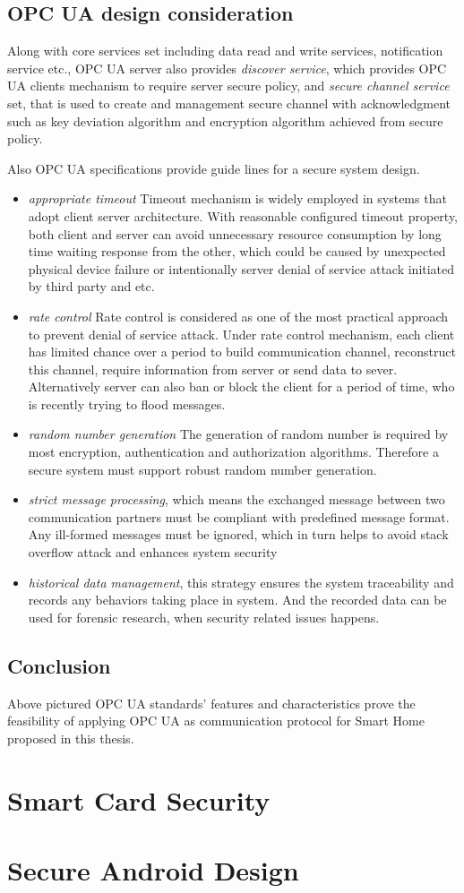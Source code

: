 \subsection{OPC UA design consideration}
Along with core services set including data read and write services, notification service etc., OPC UA server also provides \emph{discover service}\cite{O4}, which provides OPC UA clients mechanism to require server secure policy, and \emph{secure channel service} set\cite{O4}, that is used to create and management secure channel with acknowledgment such as key deviation algorithm and encryption algorithm achieved from secure policy. 

Also OPC UA specifications provide guide lines for a secure system design\cite{O4}.
\begin{itemize}
\item \emph{appropriate timeout} Timeout mechanism is widely employed in systems that adopt client server architecture. With reasonable configured timeout property, both client and server can avoid unnecessary resource consumption by long time waiting response from the other, which could be caused by unexpected physical device failure or intentionally server denial of service attack initiated by third party and etc. 
\item \emph{rate control} Rate control is considered as one of the most practical approach to prevent denial of service attack. Under rate control mechanism, each client has limited chance over a period to build communication channel, reconstruct this channel, require information from server or send data to sever. Alternatively server can also ban or block the client for a period of time, who is recently trying to flood messages. 
\item \emph{random number generation} The generation of random number is required by most encryption, authentication and authorization algorithms. Therefore a secure system must support robust random number generation.
\item \emph{strict message processing}, which means the exchanged message between two communication partners must be compliant with predefined message format. Any ill-formed messages must be ignored, which in turn helps to avoid stack overflow attack and enhances system security
\item \emph{historical data management}, this strategy ensures the system traceability and records any behaviors taking place in system. And the recorded data can be used for forensic research, when security related issues happens.
\end{itemize}
\subsection{Conclusion}
Above pictured OPC UA standards' features and characteristics prove the feasibility of applying OPC UA as communication protocol for Smart Home proposed in this thesis.

\section{Smart Card Security}

\section{Secure Android Design}